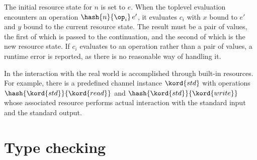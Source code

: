 The initial resource state for $n$ is set to $e$.
When the toplevel evaluation encounters an operation
$\hash{n}{\op_i} \, e'$, it evaluates $c_i$ with $x$ bound to $e'$
and $y$ bound to the current resource state. The result must be a pair of values, the first of
which is passed to the continuation, and the second of which is the new resource state.
%
If $c_i$ evaluates to an operation rather than a pair of values, a runtime error is
reported, as there is no reasonable way of handling it.

In \eff the interaction with the real world is accomplished through built-in resources.
For example, there is a predefined channel instance $\kord{std}$ with operations
$\hash{\kord{std}}{\kord{read}}$ and $\hash{\kord{std}}{\kord{write}}$ whose associated
resource performs actual interaction with the standard input and the standard output.

\section{Type checking}
\label{sec:type-checking}

